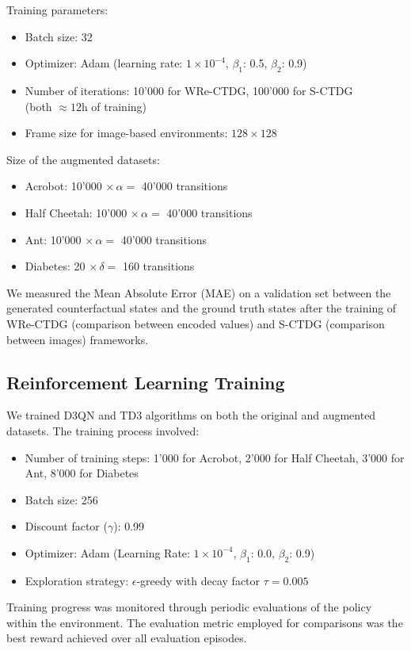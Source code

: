 Training parameters:
\begin{itemize}
    \item Batch size: 32
    \item Optimizer: Adam (learning rate: $1\times 10^{-4}$, $\beta_1$: 0.5, $\beta_2$: 0.9)
    \item Number of iterations: 10'000 for WRe-CTDG, 100'000 for S-CTDG\\
    (both $\approx 12$h of training)
    \item Frame size for image-based environments: $128\times 128$
\end{itemize}
Size of the augmented datasets:
\begin{itemize}
    \item Acrobot: 10'000 $\times \, \alpha =$ 40'000 transitions 
    \item Half Cheetah: 10'000 $\times \, \alpha =$ 40'000 transitions
    \item Ant: 10'000 $\times \, \alpha =$ 40'000 transitions
    \item Diabetes: 20 $\times \, \delta =$ 160 transitions
\end{itemize}

We measured the Mean Absolute Error (MAE) on a validation set
between the generated counterfactual states and the ground truth
states after the training of WRe-CTDG (comparison between encoded values)
and S-CTDG (comparison between images) frameworks.

\subsection{Reinforcement Learning Training}

We trained D3QN and TD3 algorithms on both the original and augmented datasets.
The training process involved:
\begin{itemize}
    \item Number of training steps: 1'000 for Acrobot, 2'000 for Half Cheetah, 3'000 for Ant, 8'000 for Diabetes
    \item Batch size: 256
    \item Discount factor ($\gamma$): 0.99
    \item Optimizer: Adam (Learning Rate: $1\times 10^{-4}$, $\beta_1$: 0.0, $\beta_2$: 0.9)
    \item Exploration strategy: $\epsilon$-greedy with decay factor $\tau = 0.005$
\end{itemize}
Training progress was monitored through periodic evaluations
of the policy within the environment.
The evaluation metric employed for comparisons was the best
reward achieved over all evaluation episodes. 

